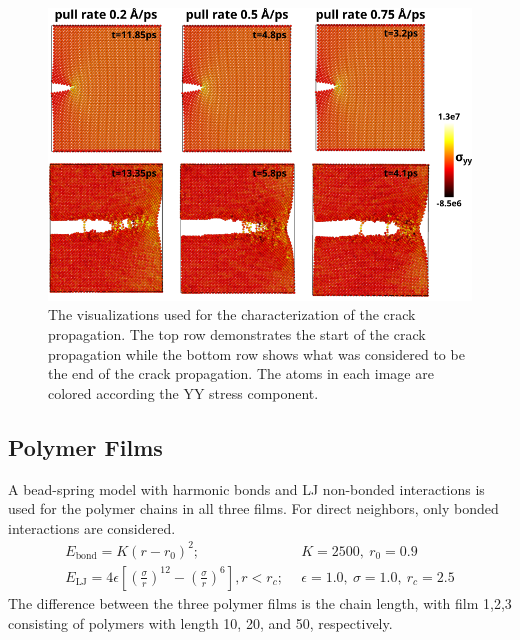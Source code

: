 \documentclass[10pt,a4paper]{labreport}
\begin{document}
\begin{figure}[h]
  \centering
  \includegraphics[width = \textwidth]{figs/ass2_cracks.png}
  \caption{The visualizations used for the characterization of the crack propagation. The top row demonstrates the start of the crack propagation while the bottom row shows what was considered to be the end of the crack propagation. The atoms in each image are colored according the YY stress component. }
  \label{fig:ass2_cracks}
\end{figure}

\newpage
\subsection{Polymer Films}
A bead-spring model with harmonic bonds and LJ non-bonded interactions is used for the polymer chains in all three films. For direct neighbors, only bonded interactions are considered. 
\begin{align}
  E_\text{bond} = K (r - r_0)^2;&~~ K=2500,~r_0 = 0.9 \\
  E_\text{LJ} = 4\epsilon\left[\left(\frac{\sigma}{r}\right)^{12} - \left(\frac{\sigma}{r}\right)^6\right], r < r_c ;& ~~ \epsilon = 1.0, ~\sigma = 1.0, ~ r_c = 2.5
\end{align} 
The difference between the three polymer films is the chain length, with film 1,2,3 consisting of polymers with length 10, 20, and 50, respectively.
\end{document}
